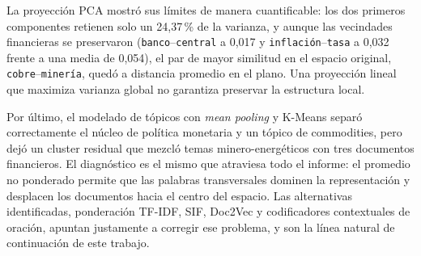 \documentclass[12pt, a4paper]{article}
\newcommand{\code}[1]{\texttt{#1}}
\begin{document}
La proyección PCA mostró sus límites de manera cuantificable: los dos primeros componentes retienen
solo un 24,37\,\% de la varianza, y aunque las vecindades financieras se preservaron
(\code{banco}--\code{central} a 0,017 y \code{inflación}--\code{tasa} a 0,032 frente a una media de
0,054), el par de mayor similitud en el espacio original, \code{cobre}--\code{minería}, quedó a
distancia promedio en el plano. Una proyección lineal que maximiza varianza global no garantiza
preservar la estructura local.

Por último, el modelado de tópicos con \textit{mean pooling} y K-Means separó correctamente el núcleo
de política monetaria y un tópico de commodities, pero dejó un cluster residual que mezcló temas
minero-energéticos con tres documentos financieros. El diagnóstico es el mismo que atraviesa todo el
informe: el promedio no ponderado permite que las palabras transversales dominen la representación y
desplacen los documentos hacia el centro del espacio. Las alternativas identificadas, ponderación
TF-IDF, SIF, Doc2Vec y codificadores contextuales de oración, apuntan justamente a corregir ese
problema, y son la línea natural de continuación de este trabajo.
\end{document}
